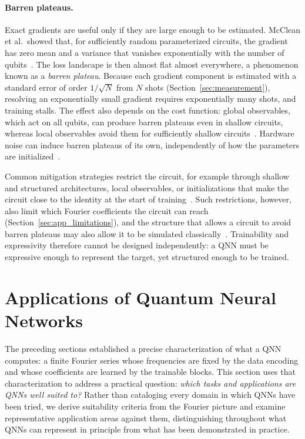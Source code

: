 \documentclass[12pt]{article}
\numberwithin{equation}{section}  %
\begin{document}
\paragraph{Barren plateaus.} Exact gradients are useful only if they are large enough to be estimated. McClean et al.\ showed that, for sufficiently random parameterized circuits, the gradient has zero mean and a variance that vanishes exponentially with the number of qubits~\cite{mcclean2018barren}. The loss landscape is then almost flat almost everywhere, a phenomenon known as a \emph{barren plateau}. Because each gradient component is estimated with a standard error of order $1/\sqrt{N}$ from $N$ shots (Section~\ref{sec:measurement}), resolving an exponentially small gradient requires exponentially many shots, and training stalls. The effect also depends on the cost function: global observables, which act on all qubits, can produce barren plateaus even in shallow circuits, whereas local observables avoid them for sufficiently shallow circuits~\cite{cerezo2021cost}. Hardware noise can induce barren plateaus of its own, independently of how the parameters are initialized~\cite{wang2021noise}.

Common mitigation strategies restrict the circuit, for example through shallow and structured architectures, local observables, or initializations that make the circuit close to the identity at the start of training~\cite{grant2019initialization}. Such restrictions, however, also limit which Fourier coefficients the circuit can reach (Section~\ref{sec:app_limitations}), and the structure that allows a circuit to avoid barren plateaus may also allow it to be simulated classically~\cite{cerezo2025does}. Trainability and expressivity therefore cannot be designed independently: a QNN must be expressive enough to represent the target, yet structured enough to be trained.


\section{Applications of Quantum Neural Networks}
\label{sec:applications}

The preceding sections established a precise characterization of what a QNN computes: a finite Fourier series whose frequencies are fixed by the data encoding and whose coefficients are learned by the trainable blocks. This section uses that characterization to address a practical question: \emph{which tasks and applications are QNNs well suited to?} Rather than cataloging every domain in which QNNs have been tried, we derive suitability criteria from the Fourier picture and examine representative application areas against them, distinguishing throughout what QNNs can represent in principle from what has been demonstrated in practice.
\end{document}
